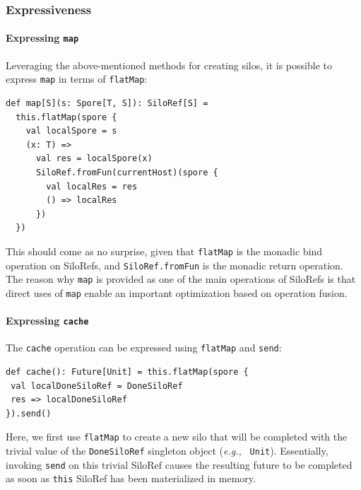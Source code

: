 \documentclass[preprint]{sigplanconf}
\theoremstyle{definition}
\theoremstyle{definition}
\newcommand{\eg}{{\em e.g.,~}}
\begin{document}
\subsubsection{Expressiveness}
\label{sec:expr}

\paragraph{Expressing \texttt{map}} Leveraging the above-mentioned methods for
creating silos, it is possible to express \verb|map| in terms of
\verb|flatMap|:

\begin{lstlisting}
def map[S](s: Spore[T, S]): SiloRef[S] =
  this.flatMap(spore {
    val localSpore = s
    (x: T) =>
      val res = localSpore(x)
      SiloRef.fromFun(currentHost)(spore {
        val localRes = res
        () => localRes
      })
  })
\end{lstlisting}
\noindent
This should come as no surprise, given that \verb|flatMap| is the monadic bind
operation on SiloRefs, and \verb|SiloRef.fromFun| is the monadic return
operation. The reason why \verb|map| is provided as one of the main operations
of SiloRefs is that direct uses of \verb|map| enable an important optimization
based on operation fusion.

\paragraph{Expressing \texttt{cache}} The \verb|cache| operation can be
expressed using \verb|flatMap| and \verb|send|:

\begin{lstlisting}
def cache(): Future[Unit] = this.flatMap(spore {
 val localDoneSiloRef = DoneSiloRef
 res => localDoneSiloRef
}).send()

\end{lstlisting}
\noindent
Here, we first use \verb|flatMap| to create a new silo that will be completed
with the trivial value of the \verb|DoneSiloRef| singleton object (\eg
\verb|Unit|). Essentially, invoking \verb|send| on this trivial SiloRef causes
the resulting future to be completed as soon as \verb|this| SiloRef has been
materialized in memory.




\end{document}
